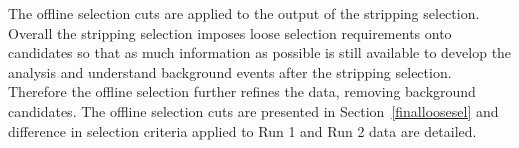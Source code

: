 


The offline selection cuts are applied to the output of the stripping selection. Overall the stripping selection imposes loose selection requirements onto \bmumu candidates so that as much information as possible is still available to develop the analysis and understand background events after the stripping selection. Therefore the offline selection further refines the data, removing background candidates. The offline selection cuts are presented in Section~\ref{finalloosesel} and difference in selection criteria applied to Run 1 and Run 2 data are detailed. 


 



